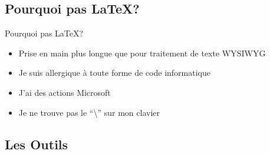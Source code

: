 \subsection{Pourquoi pas \LaTeX{}?}

\begin{frame}{Pourquoi pas \LaTeX{}?}
  \begin{itemize}
    \item Prise en main plus longue que pour traitement de texte WYSIWYG
    \item Je suis allergique à toute forme de code informatique
    \item J'ai des actions Microsoft
    \item Je ne trouve pas le ``\textbackslash'' sur mon clavier
  \end{itemize}
\end{frame}

\begin{comment}
\begin{frame}{Oui mais\ldots{}}
  \begin{center}
    \begin{tikzpicture}
      \begin{axis}[xmin=0, xmax=4, ymin=-2, ymax=5, ticks=none,
          xlabel={Expérience}, ylabel=Productivité,
        legend style={at={(0.01,0.99)}, anchor=north west}]
        \addplot[smooth, color=blue]{x-0.05};
        \addlegendentry{\LaTeX}
        \addplot[smooth, color=red,domain=0:5]{sqrt(x)};
        \addlegendentry{Word}
      \end{axis}
      \foreach \x/\com/\deltax/\deltay/\adj in {
        {1.1}/{\scriptsize Maintenant}/{0}/{0.8}/below,
        {2.2}/{\scriptsize Après la formation}/{0}/{0.4}/below,
        {4.6}/{\scriptsize Au bout de quelques semaines}/{0}/{1.2}/below
      } {
        \draw[dashed] (\x,0) -- (\x+\deltax,\deltay) node[above] {\com};
      }
    \end{tikzpicture}
  \end{center}
\end{frame}
\end{comment}

\subsection{Les Outils}

